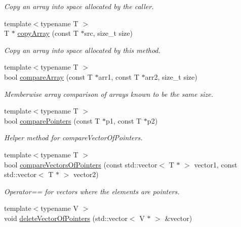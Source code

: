 \begin{DoxyCompactItemize}
\begin{DoxyCompactList}\small\item\em Copy an array into space allocated by the caller. \item\end{DoxyCompactList}\item 
{\footnotesize template$<$typename T $>$ }\\T $\ast$ \hyperlink{namespaceBUSBOY_a572172ab912dc882a1027ae02ecdec14}{copyArray} (const T $\ast$src, size\_\-t size)
\begin{DoxyCompactList}\small\item\em Copy an array into space allocated by this method. \item\end{DoxyCompactList}\item 
{\footnotesize template$<$typename T $>$ }\\bool \hyperlink{namespaceBUSBOY_afab314ffc342c103654ef4cf843d8e1f}{compareArray} (const T $\ast$arr1, const T $\ast$arr2, size\_\-t size)
\begin{DoxyCompactList}\small\item\em Memberwise array comparison of arrays known to be the same size. \item\end{DoxyCompactList}\item 
{\footnotesize template$<$typename T $>$ }\\bool \hyperlink{namespaceBUSBOY_ada56f4be13026b9d79af28c8d7e97991}{comparePointers} (const T $\ast$p1, const T $\ast$p2)
\begin{DoxyCompactList}\small\item\em Helper method for compareVectorOfPointers. \item\end{DoxyCompactList}\item 
{\footnotesize template$<$typename T $>$ }\\bool \hyperlink{namespaceBUSBOY_ab0e8dfb62808cc1ad5e55a91524bac51}{compareVectorsOfPointers} (const std::vector$<$ T $\ast$ $>$ vector1, const std::vector$<$ T $\ast$ $>$ vector2)
\begin{DoxyCompactList}\small\item\em Operator== for vectors where the elements are pointers. \item\end{DoxyCompactList}\item 
{\footnotesize template$<$typename V $>$ }\\void \hyperlink{namespaceBUSBOY_a31674a02d5b0c7247036251b9ddfb446}{deleteVectorOfPointers} (std::vector$<$ V $\ast$ $>$ \&vector)

\end{DoxyCompactItemize}

